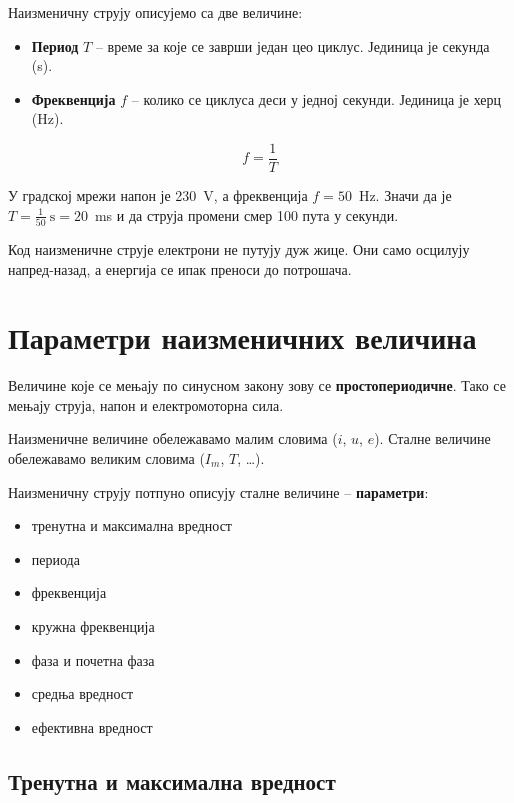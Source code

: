 \documentclass{article}
\begin{document}
Наизменичну струју описујемо са две величине:
\begin{itemize}
    \item \textbf{Период} $T$ -- време за које се заврши један цео циклус. Јединица је секунда (s).
    \item \textbf{Фреквенција} $f$ -- колико се циклуса деси у једној секунди. Јединица је херц (Hz).
\end{itemize}

\begin{equation}
    f = \frac{1}{T}
\end{equation}

У градској мрежи напон је 230~V, а фреквенција $f = 50$~Hz. Значи да је $T = \frac{1}{50}~\mathrm{s} = 20$~ms и да струја промени смер 100 пута у секунди.

Код наизменичне струје електрони не путују дуж жице. Они само осцилују напред-назад, а енергија се ипак преноси до потрошача.


\section{Параметри наизменичних величина}

Величине које се мењају по синусном закону зову се \textbf{простопериодичне}. Тако се мењају струја, напон и електромоторна сила.

Наизменичне величине обележавамо малим словима ($i$, $u$, $e$). Сталне величине обележавамо великим словима ($I_m$, $T$, \dots).

Наизменичну струју потпуно описују сталне величине -- \textbf{параметри}: 
\begin{itemize}
\item тренутна и максимална вредност
\item периода
\item фреквенција
\item кружна фреквенција
\item фаза и почетна фаза
\item средња вредност
\item ефективна вредност
\end{itemize}

\subsection{Тренутна и максимална вредност}
\end{document}
